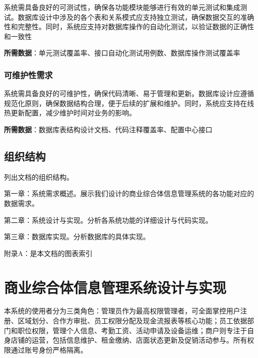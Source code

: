\documentclass[]{article}
\begin{document}
系统需具备良好的可测试性，确保各功能模块能够进行有效的单元测试和集成测试。数据库设计中涉及的各个表和关系模式应支持独立测试，确保数据交互的准确性和完整性。同时，系统应支持对数据库操作的自动化测试，以验证数据的正确性和一致性

\textbf{所需数据}：单元测试覆盖率、接口自动化测试用例数、数据库操作测试覆盖率

\hypertarget{ux53efux7ef4ux62a4ux6027ux9700ux6c42}{%
  \subsubsection{可维护性需求}\label{ux53efux7ef4ux62a4ux6027ux9700ux6c42}}

系统需具备良好的可维护性，确保代码清晰、易于管理和更新。数据库设计应遵循规范化原则，确保数据结构合理，便于后续的扩展和维护。同时，系统应支持在线热更新配置，减少维护时间对业务的影响。

\textbf{所需数据}：数据库表结构设计文档、代码注释覆盖率、配置中心接口

\hypertarget{ux7ec4ux7ec7ux7ed3ux6784}{%
  \subsection{组织结构}\label{ux7ec4ux7ec7ux7ed3ux6784}}

列出文档的组织结构。

第一章：系统需求概述。展示我们设计的商业综合体信息管理系统的各功能对应的数据需求。

第二章：系统设计与实现。分析各系统功能的详细设计与代码实现。

第三章：数据库实现。分析数据库的具体实现。

附录A：是本文档的图表索引

\hypertarget{ux5546ux4e1aux7efcux5408ux4f53ux4fe1ux606fux7ba1ux7406ux7cfbux7edfux8bbeux8ba1ux4e0eux5b9eux73b0}{%
  \section{商业综合体信息管理系统设计与实现}\label{ux5546ux4e1aux7efcux5408ux4f53ux4fe1ux606fux7ba1ux7406ux7cfbux7edfux8bbeux8ba1ux4e0eux5b9eux73b0}}

本系统的使用者分为三类角色：管理员作为最高权限管理者，可全面掌控用户注册、区域划分、合作方审批、员工权限分配及现金流报表等核心功能；员工依据部门和职位权限，管理个人信息、考勤工资、活动申请及设备运维；商户则专注于自身店铺的运营，包括信息维护、租金缴纳、店面状态更新及促销活动参与。所有权限通过账号身份严格隔离。
\end{document}

